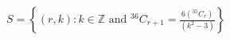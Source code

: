 \documentclass[preview]{standalone}
\begin{document}
\begin{center}
$S = \left\{(r, k) : k \in \mathbb{Z} \text{ and } {}^{36}C_{r+1} = \frac{6({}^{35}C_r)}{(k^2-3)}\right\}$
\end{center}
\end{document}
